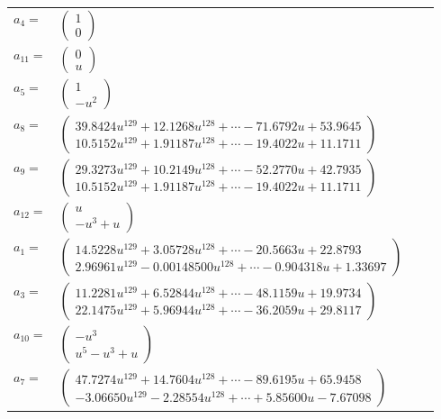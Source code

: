 \documentclass[1p]{elsarticle_modified}
\theoremstyle{definition}
\begin{document}
\begin{tabular}{m{7pt} m{180pt} m{7pt} m{180pt} }
\flushright $a_{4}=$&$\begin{pmatrix}1\\0\end{pmatrix}$ \\
\flushright $a_{11}=$&$\begin{pmatrix}0\\u\end{pmatrix}$ \\
\flushright $a_{5}=$&$\begin{pmatrix}1\\- u^2\end{pmatrix}$ \\
\flushright $a_{8}=$&$\begin{pmatrix}39.8424 u^{129}+12.1268 u^{128}+\cdots-71.6792 u+53.9645\\10.5152 u^{129}+1.91187 u^{128}+\cdots-19.4022 u+11.1711\end{pmatrix}$ \\
\flushright $a_{9}=$&$\begin{pmatrix}29.3273 u^{129}+10.2149 u^{128}+\cdots-52.2770 u+42.7935\\10.5152 u^{129}+1.91187 u^{128}+\cdots-19.4022 u+11.1711\end{pmatrix}$ \\
\flushright $a_{12}=$&$\begin{pmatrix}u\\- u^3+u\end{pmatrix}$ \\
\flushright $a_{1}=$&$\begin{pmatrix}14.5228 u^{129}+3.05728 u^{128}+\cdots-20.5663 u+22.8793\\2.96961 u^{129}-0.00148500 u^{128}+\cdots-0.904318 u+1.33697\end{pmatrix}$ \\
\flushright $a_{3}=$&$\begin{pmatrix}11.2281 u^{129}+6.52844 u^{128}+\cdots-48.1159 u+19.9734\\22.1475 u^{129}+5.96944 u^{128}+\cdots-36.2059 u+29.8117\end{pmatrix}$ \\
\flushright $a_{10}=$&$\begin{pmatrix}- u^3\\u^5- u^3+u\end{pmatrix}$ \\
\flushright $a_{7}=$&$\begin{pmatrix}47.7274 u^{129}+14.7604 u^{128}+\cdots-89.6195 u+65.9458\\-3.06650 u^{129}-2.28554 u^{128}+\cdots+5.85600 u-7.67098\end{pmatrix}$ \\

\end{tabular}
\end{document}
